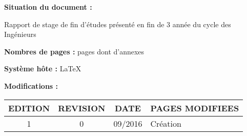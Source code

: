 \textbf{Situation du document :} 
\vspace{0.2cm}
\par
Rapport de stage de fin d'études présenté en fin de 3 année du cycle des Ingénieurs
\vspace{0.3cm}



\textbf{Nombres de pages :}  pages dont  d'annexes
\vspace{0.3cm}

\textbf{Système hôte :} \LaTeX
\vspace{1cm}


\textbf{Modifications :} 
\begin{center}
\begin{tabular}{|c|c|c|>{\centering}p{6.5cm}|}
\hline 
EDITION & REVISION & DATE & PAGES MODIFIEES\tabularnewline
\hline
\hline 
1 & 0 & 09/2016 & Création\tabularnewline
\hline 

\end{tabular}
\end{center}